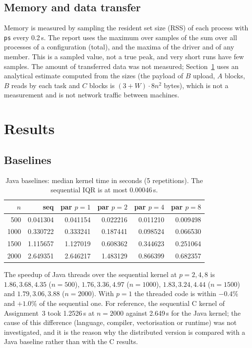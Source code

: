 \documentclass[11pt,a4paper]{article}
\begin{document}
\subsection{Memory and data transfer}
Memory is measured by sampling the resident set size (RSS) of each process with \texttt{ps}
every 0.2\,s. The report uses the maximum over samples of the sum over all processes of a
configuration (total), and the maxima of the driver and of any member. This is a sampled
value, not a true peak, and very short runs have few samples. The amount of transferred data
was not measured; Section~\ref{sec:results} uses an analytical estimate computed from the
sizes (the payload of $B$ upload, $A$ blocks, $B$ reads by each task and $C$ blocks is
$(3+W)\cdot 8n^2$ bytes), which is not a measurement and is not network traffic between
machines.

\section{Results}\label{sec:results}
\subsection{Baselines}
\begin{table}[H]
\centering
\caption{Java baselines: median kernel time in seconds (5 repetitions). The sequential IQR is at most 0.00046\,s.}
\small
\begin{tabular}{@{}rrrrrr@{}}
\toprule
$n$ & seq & par $p=1$ & par $p=2$ & par $p=4$ & par $p=8$ \\
\midrule
500  & 0.041304 & 0.041154 & 0.022216 & 0.011210 & 0.009498 \\
1000 & 0.330722 & 0.333241 & 0.187441 & 0.098524 & 0.066530 \\
1500 & 1.115657 & 1.127019 & 0.608362 & 0.344623 & 0.251064 \\
2000 & 2.649351 & 2.646217 & 1.483129 & 0.866399 & 0.682357 \\
\bottomrule
\end{tabular}
\end{table}
The speedup of Java threads over the sequential kernel at $p=2,4,8$ is $1.86, 3.68, 4.35$
($n=500$), $1.76, 3.36, 4.97$ ($n=1000$), $1.83, 3.24, 4.44$ ($n=1500$) and
$1.79, 3.06, 3.88$ ($n=2000$). With $p=1$ the threaded code is within $-0.4\%$ and $+1.0\%$ of
the sequential one. For reference, the sequential C kernel of Assignment~3 took 1.2526\,s at
$n=2000$ against 2.649\,s for the Java kernel; the cause of this difference (language,
compiler, vectorisation or runtime) was not investigated, and it is the reason why the
distributed version is compared with a Java baseline rather than with the C results.
\end{document}

